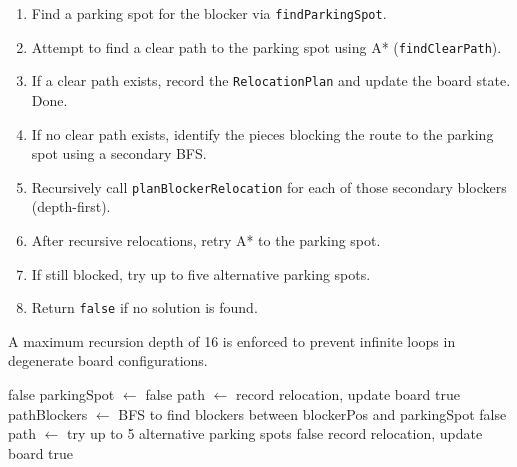 \documentclass[11pt,a4paper]{report}
\begin{document}
\begin{enumerate}
    \item Find a parking spot for the blocker via \texttt{findParkingSpot}.
    \item Attempt to find a clear path to the parking spot using A* (\texttt{findClearPath}).
    \item If a clear path exists, record the \texttt{RelocationPlan} and update the board state. Done.
    \item If no clear path exists, identify the pieces blocking the route to the parking spot using a secondary BFS.
    \item Recursively call \texttt{planBlockerRelocation} for each of those secondary blockers (depth-first).
    \item After recursive relocations, retry A* to the parking spot.
    \item If still blocked, try up to five alternative parking spots.
    \item Return \texttt{false} if no solution is found.
\end{enumerate}

A maximum recursion depth of 16 is enforced to prevent infinite loops in degenerate board configurations.

\begin{algorithm}
\caption{Recursive Blocker Relocation}
\begin{algorithmic}[1]
        \Return false
    \EndIf
    \State parkingSpot $\gets$ 
        \Return false
    \EndIf
    \State path $\gets$ 
        \State record relocation, update board
        \Return true
    \EndIf
    \State pathBlockers $\gets$ BFS to find blockers between blockerPos and parkingSpot
                \Return false
            \EndIf
        \EndIf
    \EndFor
    \State path $\gets$ 
        \State try up to 5 alternative parking spots
    \EndIf
        \Return false
    \EndIf
    \State record relocation, update board
    \Return true
\EndProcedure
\end{algorithmic}
\end{algorithm}
\end{document}
